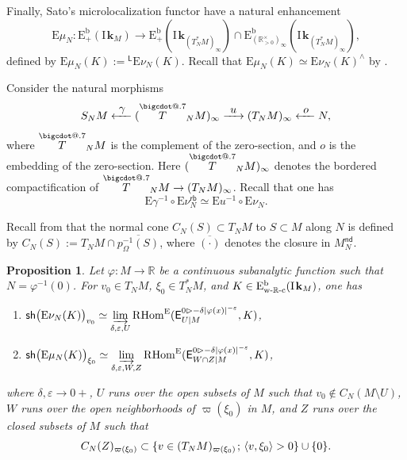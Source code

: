 \documentclass[11pt]{article}
\makeatletter
\numberwithin{equation}{section}
\newcommand{\To}[1][]{\mathchoice{\xrightarrow{\textstyle\kern4pt#1\kern3pt}}{\stackrel{#1}{\longrightarrow}}{}{}}
\newcommand\From[1][]{\mathchoice{\xleftarrow{\textstyle~#1~}}{\stackrel{#1}{\longleftarrow}}{}{}}
\newenvironment{enumeratei}
{\bgroup\def\theenumi{\roman{enumi}}\def\theenumii{\alph{enumii}}\begin{enumerate}}
{\end{enumerate}\egroup}
\newcommand{\accentset}[2]{\overset{#1}{#2}}
\newcommand*\bigcdot{\mathpalette\bigcdot@{.7}}
\newcommand*\bigcdot@[2]{\mathbin{\vcenter{\hbox{\scalebox{#2}{$\m@th#1\bullet$}}}}}
\newcommand{\bdot}[1]{{\accentset{\bigcdot}{#1}}\vphantom{#1}}
\newcommand{\semicolon}{\nobreak \mskip2mu\mathpunct{}\nonscript\mkern-\thinmuskip{;}\mskip6mu plus1mu\relax}
\newcommand{\bl}{\bigl(}
\newcommand{\br}{\bigr)}
\theoremstyle{plain}
\newtheorem{proposition}[theorem]{Proposition}
\theoremstyle{definition}
\newcommand{\R}{\mathbb{R}}
\newcommand{\derived}[1]{\mathrm{#1}}
\newcommand{\dere}{\derived{E}}\let\enh\dere
\newcommand{\derr}{\derived{R}}
\newcommand{\BECcon}[2][\ifield]{\dere^{\mathrm{b}}_{\bGmp}(#1_{#2})}
\newcommand{\BECp}[2][\ifield]{\dere^{\mathrm{b}}_+(#1_{#2})}
\newcommand{\BECwRc}[2][\ifield]{\dere^{\mathrm{b}}_\wRc(#1_{#2})}
\newcommand{\RHom}[1][]{\derr\mathrm{Hom}_{\raise1.5ex\hbox to.1em{}#1}}
\newcommand{\FHom}{\RHom^\enh}
\newcommand{\Eopb}[1]{\enh#1^{-1}}
\newcommand{\Emu}{\enh\mu}
\newcommand{\Enu}{\enh\nu}
\newcommand{\wRc}{{\mathrm{w}\text-\R\text-\mathrm{c}}}
\newcommand{\field}{\mathbf{k}}\let\cor\field
\newcommand{\ind}{\mathrm{I}\mspace{2mu}}
\newcommand{\ifield}{\ind\field}
\newcommand{\inbordered}[1]{{#1_\infty}}
\let\inb \inbordered
\newcommand{\range}[2]{#1 \mathbin{\rhd} #2}
\newcommand{\nd}{\mathsf{nd}}
\newcommand{\rb}{\mathsf{rb}}
\newcommand{\sh}{\mathsf{sh}}
\newcommand{\Gmp}{\R^\times_{>0}}
\newcommand{\bGmp}{\inbordered{(\Gmp)}}
\newcommand{\Lap}{\mathsf{L}}
\newcommand{\lap}{{}^\Lap}
\newcommand{\ND}[2][N]{#2_{#1}^{\nd}}
\newcommand{\defeq}{\mathbin{:=}}\let \seteq\defeq
\newcommand{\ilim}[1][]{\mathop{\varinjlim}\limits_{#1}}
\newcommand{\opb}[1]{#1^{-1}}
\makeatother
\begin{document}
Finally, Sato's microlocalization functor have a natural enhancement
\[
\Emu_N \colon \BECp M \to \BECp{\inb{(T^*_NM)}}\cap \BECcon{\inb{(T^*_NM)}},
\]
defined by $\Emu_N(K) \defeq \lap\Enu_N(K)$. Recall that $\Emu_N(K) \simeq \Enu_N(K)^\wedge$ by \cite[Prop.\,5.3]{DK19nu}.

Consider the natural morphisms
\[
S_NM \From[\gamma] \inb{(\bdot T_NM)} \To[u] \inb{(T_NM)} \From[o] N,
\]
where $\bdot T_NM$ is the complement of the zero-section, and $o$ is the embedding of the zero-section.
Here $\inb{(\bdot T_NM)}$ denotes the bordered compactification of $\bdot T_NM\to\inb{(T_NM)}$.
Recall that one has
\[
\Eopb\gamma \circ \Enu_N^\rb \simeq \Eopb u \circ \Enu_N.
\]

Recall from \cite[\S4.1]{KS90} that the normal cone $C_N(S)\subset T_NM$ to $S\subset M$ along $N$ is defined by $C_N(S) \defeq T_NM\cap\overline{\opb{p_\Omega}(S)}$,
where $\overline{(\cdot)}$ denotes the closure in $\ND M$.

\begin{proposition}\label{pro:numugerm}
Let $\varphi\colon M\to \R$ be a continuous subanalytic function such that
$N = \varphi^{-1}(0)$.
For $v_0\in T_NM$, $\xi_0\in T^*_NM$, and $K\in\BECwRc M$, one has
\begin{enumeratei}
\item
\label{pro:numugermi}
$\sh\bl\Enu_N(K)\br_{v_0} \simeq
\ilim[\delta,\varepsilon,U]
\FHom( \exx^{\range0{-\delta|\varphi(x)|^{-\varepsilon}}}_{U|M} , K)$,
\item
\label{pro:numugermii}
$\sh\bl\Emu_N(K)\br_{\xi_0} \simeq
\ilim[\delta,\varepsilon, W, Z]
\FHom(\exx^{\range0{-\delta|\varphi(x)|^{-\varepsilon}}}_{W\cap Z|M} , K)$,
\end{enumeratei}
\noindent
where $\delta,\varepsilon\to0+$, $U$ runs over the open subsets of $M$ such that $v_0\notin C_N(M\setminus U)$, $W$ runs over the open neighborhoods of $\varpi(\xi_0)$ in $M$, and
$Z$ runs over the closed subsets of $M$ such that
\[
C_N(Z)_{\varpi(\xi_0)}\subset\{v\in(T_NM)_{\varpi(\xi_0)}\semicolon \langle v,\xi_0\rangle>0\}\cup\{0\}.
\]
\end{proposition}
\end{document}
